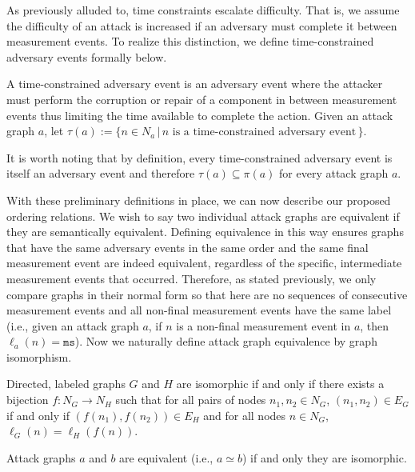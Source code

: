 \documentclass[runningheads]{llncs}
\theoremstyle{definition}
\begin{document}
As previously alluded to, time constraints escalate difficulty. That is, we assume the difficulty of an attack is increased if an adversary must complete it between measurement events. To realize this distinction, we define time-constrained adversary events formally below.  

\begin{definition}
    A time-constrained adversary event is an adversary event where the attacker must perform the corruption or repair of a component in between measurement events thus limiting the time available to complete the action. Given an attack graph $a$, let $\tau(a) := \{n \in N_a \,|\, n \text{ is a time-constrained adversary event}\,\}$.
\end{definition}

\noindent It is worth noting that by definition, every time-constrained adversary event is itself an adversary event and therefore $\tau(a) \subseteq \pi(a)$ for every attack graph $a$.


With these preliminary definitions in place, we can now describe our proposed ordering relations. We wish to say two individual attack graphs are equivalent if they are semantically equivalent. Defining equivalence in this way ensures graphs that have the same adversary events in the same order and the same final measurement event are indeed equivalent, regardless of the specific, intermediate measurement events that occurred. Therefore, as stated previously, we only compare graphs in their normal form so that here are no sequences of consecutive measurement events and all non-final measurement events have the same label (i.e., given an attack graph $a$, if $n$ is a non-final measurement event in $a$, then $\ell_a(n) = \texttt{ms}$). Now we naturally define attack graph equivalence by graph isomorphism.


\begin{definition}[Isomorphism]
    Directed, labeled graphs $G$ and $H$ are isomorphic if and only if there exists a bijection $f : N_G \to N_H$ such that for all pairs of nodes $n_1, n_2 \in N_G$, $(n_1,n_2) \in E_G$ if and only if $(f(n_1),f(n_2)) \in E_H$ and for all nodes $n \in N_G$, $\ell_G(n) = \ell_H(f(n))$.
\end{definition}


\begin{definition}
  Attack graphs $a$ and $b$ are equivalent (i.e., $a \simeq b$) if and only they are isomorphic.
\end{definition}
\end{document}
